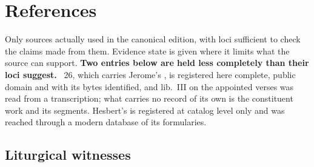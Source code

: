 \section*{References}

Only sources actually used in the canonical edition, with loci sufficient to
check the claims made from them. Evidence state is given where it limits what the source can support.
\textbf{Two entries below are held less completely than their loci suggest.}
~26, which carries Jerome's , is registered here complete, public domain and with its
bytes identified, and lib.~III on the appointed verses was read from a
transcription; what carries no record of its own is the constituent work and its
segments. Hesbert's  is registered at
catalog level only and was reached through a modern database of its
formularies.

\subsection*{Liturgical witnesses}

